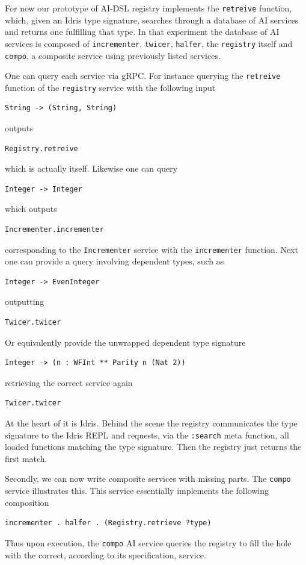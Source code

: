 \documentclass[]{report}
\begin{document}
For now our prototype of AI-DSL registry implements the
\texttt{retreive} function, which, given an Idris type signature,
searches through a database of AI services and returns one fulfilling
that type.  In that experiment the database of AI services is composed
of \texttt{incrementer}, \texttt{twicer}, \texttt{halfer}, the
\texttt{registry} itself and \texttt{compo}, a composite service using
previously listed services.

One can query each service via gRPC.  For instance querying the
\texttt{retreive} function of the \texttt{registry} service with the
following input
\begin{verbatim}
String -> (String, String)
\end{verbatim}
outputs
\begin{verbatim}
Registry.retreive
\end{verbatim}
which is actually itself.  Likewise one can query
\begin{verbatim}
Integer -> Integer
\end{verbatim}
which outputs
\begin{verbatim}
Incrementer.incrementer
\end{verbatim}
corresponding to the \texttt{Incrementer} service with the
\texttt{incrementer} function.
Next one can provide a query involving dependent types, such as
\begin{verbatim}
Integer -> EvenInteger
\end{verbatim}
outputting
\begin{verbatim}
Twicer.twicer
\end{verbatim}
Or equivalently provide the unwrapped dependent type signature
\begin{verbatim}
Integer -> (n : WFInt ** Parity n (Nat 2))
\end{verbatim}
retrieving the correct service again
\begin{verbatim}
Twicer.twicer
\end{verbatim}

At the heart of it is Idris.  Behind the scene the registry
communicates the type signature to the Idris REPL and requests, via
the \texttt{:search} meta function, all loaded functions matching the
type signature.  Then the registry just returns the first match.

Secondly, we can now write composite services with missing parts.  The
\texttt{compo} service illustrates this.  This service essentially
implements the following composition
\begin{verbatim}
incrementer . halfer . (Registry.retrieve ?type)
\end{verbatim}
Thus upon execution, the \texttt{compo} AI service queries the
registry to fill the hole with the correct, according to its
specification, service.
\end{document}
